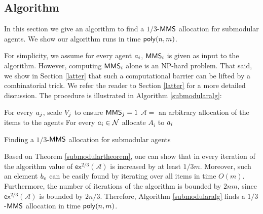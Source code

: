 \subsection{Algorithm}\label{submodularalgorithm}
In this section we give an algorithm to find a $1/3$-$\mathsf{MMS}$ allocation for submodular agents. We show our algorithm runs in time $\mathsf{poly}(n,m)$.

For simplicity, we assume for every agent $a_i$, $\mathsf{MMS}_i$ is given as input to the algorithm. However, computing $\mathsf{MMS}_i$ alone is an NP-hard problem. That said, we show in Section \ref{latter} that such a computational barrier can be lifted by a combinatorial trick. We refer the reader to Section \ref{latter} for a more detailed discussion. The procedure is illustrated in Algorithm \ref{submodularalg}:
\begin{algorithm}%
	For every $a_j$, scale $V_j$ to  ensure $\mathsf{MMS}_j = 1$\;
	$\mathcal{A} = $ an arbitrary allocation of the items to the agents\;
	For every $a_i \in \mathcal{N}$ allocate $A_i$ to $a_i$\;
	\caption{Finding a $1/3$-$\mathsf{MMS}$ allocation for submodular agents}
	\label{submodularalg}
\end{algorithm}
Based on Theorem \ref{submodulartheorem}, one can show that in every iteration of the algorithm value of $\mathsf{ex}^{2/3}(\mathcal{A})$ is increased by at least $1/3m$. Moreover, such an element $b_e$ can be easily found by iterating over all items in time $O(m)$. Furthermore, the number of iterations of the algorithm is bounded by $2nm$, since $\mathsf{ex}^{2/3}(\mathcal{A})$ is bounded by $2n/3$. Therefore, Algorithm \ref{submodularalg} finds a $1/3$-$\mathsf{MMS}$ allocation in time $\mathsf{poly}(n,m)$.

